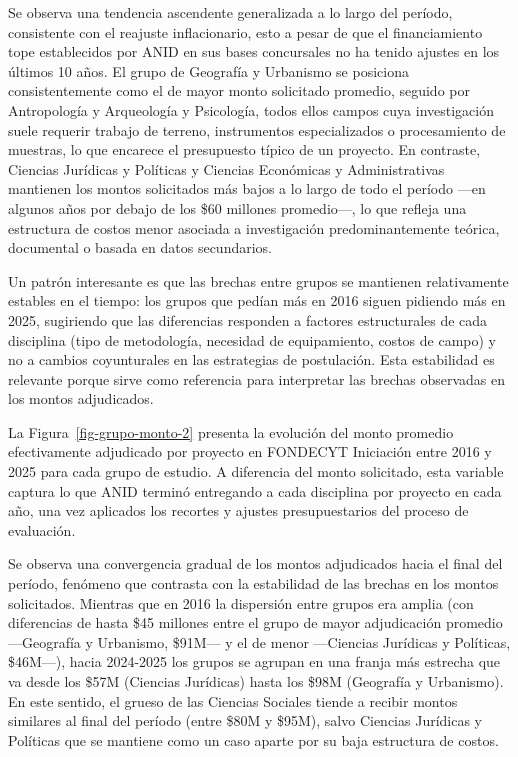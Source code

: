 \documentclass[
  spanish,
  a4paper,
  oneside]{scrbook}
\begin{document}
Se observa una tendencia ascendente generalizada a lo largo del período,
consistente con el reajuste inflacionario, esto a pesar de que el
financiamiento tope establecidos por ANID en sus bases concursales no ha
tenido ajustes en los últimos 10 años. El grupo de Geografía y Urbanismo
se posiciona consistentemente como el de mayor monto solicitado
promedio, seguido por Antropología y Arqueología y Psicología, todos
ellos campos cuya investigación suele requerir trabajo de terreno,
instrumentos especializados o procesamiento de muestras, lo que encarece
el presupuesto típico de un proyecto. En contraste, Ciencias Jurídicas y
Políticas y Ciencias Económicas y Administrativas mantienen los montos
solicitados más bajos a lo largo de todo el período ---en algunos años
por debajo de los \$60 millones promedio---, lo que refleja una
estructura de costos menor asociada a investigación predominantemente
teórica, documental o basada en datos secundarios.

Un patrón interesante es que las brechas entre grupos se mantienen
relativamente estables en el tiempo: los grupos que pedían más en 2016
siguen pidiendo más en 2025, sugiriendo que las diferencias responden a
factores estructurales de cada disciplina (tipo de metodología,
necesidad de equipamiento, costos de campo) y no a cambios coyunturales
en las estrategias de postulación. Esta estabilidad es relevante porque
sirve como referencia para interpretar las brechas observadas en los
montos adjudicados.

La Figura~\ref{fig-grupo-monto-2} presenta la evolución del monto
promedio efectivamente adjudicado por proyecto en FONDECYT Iniciación
entre 2016 y 2025 para cada grupo de estudio. A diferencia del monto
solicitado, esta variable captura lo que ANID terminó entregando a cada
disciplina por proyecto en cada año, una vez aplicados los recortes y
ajustes presupuestarios del proceso de evaluación.

Se observa una convergencia gradual de los montos adjudicados hacia el
final del período, fenómeno que contrasta con la estabilidad de las
brechas en los montos solicitados. Mientras que en 2016 la dispersión
entre grupos era amplia (con diferencias de hasta \$45 millones entre el
grupo de mayor adjudicación promedio ---Geografía y Urbanismo, \$91M---
y el de menor ---Ciencias Jurídicas y Políticas, \$46M---), hacia
2024-2025 los grupos se agrupan en una franja más estrecha que va desde
los \$57M (Ciencias Jurídicas) hasta los \$98M (Geografía y Urbanismo).
En este sentido, el grueso de las Ciencias Sociales tiende a recibir
montos similares al final del período (entre \$80M y \$95M), salvo
Ciencias Jurídicas y Políticas que se mantiene como un caso aparte por
su baja estructura de costos.
\end{document}
